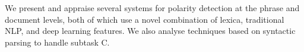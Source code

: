We present and appraise several systems for polarity detection at the phrase and document levels, both of which use a novel combination of lexica, traditional NLP, and deep learning features. We also analyse techniques based on syntactic parsing to handle subtask C.
